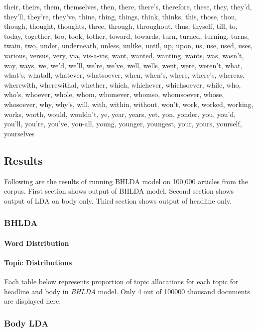 \documentclass[a4paper]{article}
\begin{document}
their, theirs, them, themselves, then, there, there's, therefore, these, they, they'd, they'll, they're, they've, thine, thing, things, think, thinks, this, those, thou, though, thought, thoughts, three, through, throughout, thus, thyself, till, to, today, together, too, took, tother, toward, towards, turn, turned, turning, turns, twain, two, under, underneath, unless, unlike, until, up, upon, us, use, used, uses, various, versus, very, via, vis-a-vis, want, wanted, wanting, wants, was, wasn't, way, ways, we, we'd, we'll, we're, we've, well, wells, went, were, weren't, what, what's, whatall, whatever, whatsoever, when, when's, where, where's, whereas, wherewith, wherewithal, whether, which, whichever, whichsoever, while, who, who's, whoever, whole, whom, whomever, whomso, whomsoever, whose, whosoever, why, why's, will, with, within, without, won't, work, worked, working, works, worth, would, wouldn't, ye, year, years, yet, yon, yonder, you, you'd, you'll, you're, you've, you-all, young, younger, youngest, your, yours, yourself, yourselves


\subsection{Results}
Following are the results of running BHLDA model on 100,000 articles from the corpus. First section shows output of BHLDA model. Second section shows output of LDA on body only. Third section shows output of headline only.

\subsubsection{BHLDA} \label{BHLDA output}

\paragraph{Word Distribution} \label{word_bhlda}

\paragraph{Topic Distributions} \label{topics_bhlda}
Each table below represents proportion of topic allocations for each topic for headline and body in \emph{BHLDA} model. Only 4 out of 100000 thousand documents are displayed here. 


\subsubsection{Body LDA} \label{body lda output}
\end{document}
